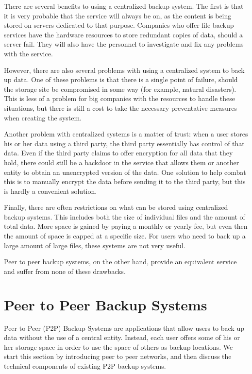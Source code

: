 \documentclass[12pt]{report}
\begin{document}
There are several benefits to using a centralized backup system. The first is that it is very probable that the service will always be on, as the content is being stored on servers dedicated to that purpose. Companies who offer file backup services have the hardware resources to store redundant copies of data, should a server fail. They will also have the personnel to investigate and fix any problems with the service.

However, there are also several problems with using a centralized system to back up data. One of these problems is that there is a single point of failure, should the storage site be compromised in some way (for example, natural disasters). This is less of a problem for big companies with the resources to handle these situations, but there is still a cost to take the necessary preventative measures when creating the system.

Another problem with centralized systems is a matter of trust: when a user stores his or her data using a third party, the third party essentially has control of that data. Even if the third party claims to offer encryption for all data that they hold, there could still be a backdoor in the service that allows them or another entity to obtain an unencrypted version of the data. One solution to help combat this is to manually encrypt the data before sending it to the third party, but this is hardly a convenient solution.

Finally, there are often restrictions on what can be stored using centralized backup systems. This includes both the size of individual files and the amount of total data. More space is gained by paying a monthly or yearly fee, but even then the amount of space is capped at a specific size. For users who need to back up a large amount of large files, these systems are not very useful.

Peer to peer backup systems, on the other hand, provide an equivalent service and suffer from none of these drawbacks.

\section{Peer to Peer Backup Systems}

Peer to Peer (P2P) Backup Systems are applications that allow users to back up data without the use of a central entity. Instead, each user offers some of his or her storage space in order to use the space of others as backup locations. We start this section by introducing peer to peer networks, and then discuss the technical components of existing P2P backup systems.
\end{document}
